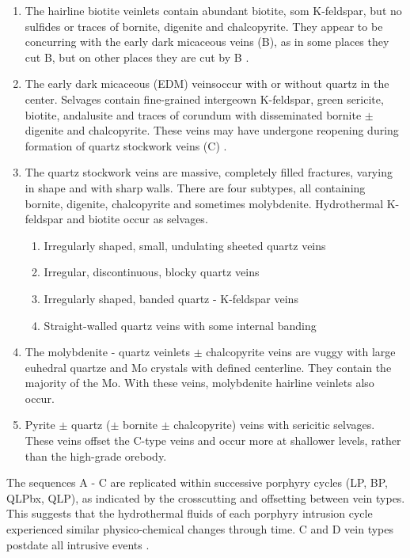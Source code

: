 \documentclass[a4paper,11pt,titlepage]{article}
\begin{document}
\renewcommand{\theenumi}{\Alph{enumi}}
\begin{enumerate}
\item The hairline biotite veinlets contain abundant biotite, som K-feldspar, but no sulfides or traces of bornite, digenite and chalcopyrite. They appear to be concurring with the early dark micaceous veins (B), as in some places they cut B, but on other places they are cut by B \citep{Landtwing2004}.
\item The early dark micaceous (EDM) veinsoccur with or without quartz in the center. Selvages contain fine-grained intergeown K-feldspar, green sericite, biotite, andalusite and traces of corundum \citep{Redmond2002} with disseminated bornite $\pm$ digenite and chalcopyrite. These veins may have undergone reopening during formation of quartz stockwork veins (C) \citep{Landtwing2004}.
\item The quartz stockwork veins are massive, completely filled fractures, varying in shape and with sharp walls. There are four subtypes, all containing bornite, digenite, chalcopyrite and sometimes molybdenite. Hydrothermal K-feldspar and biotite occur as selvages.
\begin{enumerate}
\item Irregularly shaped, small, undulating sheeted quartz veins
\item Irregular, discontinuous, blocky quartz veins
\item Irregularly shaped, banded quartz - K-feldspar veins
\item Straight-walled quartz veins with some internal banding
\end{enumerate}
\item The molybdenite - quartz veinlets $\pm$ chalcopyrite veins are vuggy with large euhedral quartze and Mo crystals with defined centerline. They contain the majority of the Mo. With these veins, molybdenite hairline veinlets also occur.
\item Pyrite $\pm$ quartz ($\pm$ bornite $\pm$ chalcopyrite) veins with sericitic selvages. These veins offset the C-type veins and occur more at shallower levels, rather than the high-grade orebody.
\end{enumerate}
The sequences A - C are replicated within successive porphyry cycles (LP, BP, QLPbx, QLP), as indicated by the crosscutting and offsetting between vein types. This suggests that the hydrothermal fluids of each porphyry intrusion cycle experienced similar physico-chemical changes through time. C and D vein types postdate all intrusive events \citep{Landtwing2004}.
\end{document}
